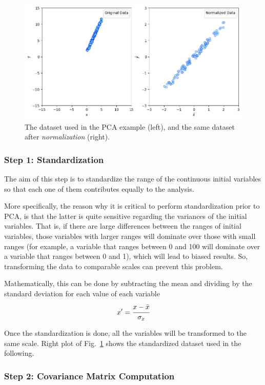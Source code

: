 \begin{figure}[htb]
	\centering
	\includegraphics[width=0.9\linewidth]{figures/pca_example_raw_normalized_data.png}
	\caption{The dataset used in the PCA example (left), and the same dataset after \emph{normalization} (right).}
	\label{fig:pca_dataset}
\end{figure}

\subsubsection*{Step 1: Standardization}

The aim of this step is to standardize the range of the continuous initial variables so that each one of them contributes equally to the analysis.

More specifically, the reason why it is critical to perform standardization prior to PCA, is that the latter is quite sensitive regarding the variances of the initial variables. That is, if there are large differences between the ranges of initial variables, those variables with larger ranges will dominate over those with small ranges (for example, a variable that ranges between 0 and 100 will dominate over a variable that ranges between 0 and 1), which will lead to biased results. So, transforming the data to comparable scales can prevent this problem.

Mathematically, this can be done by subtracting the mean and dividing by the standard deviation for each value of each variable
\begin{equation*}
x' = \cfrac{x-\bar{x}}{\sigma_x}
\end{equation*}

Once the standardization is done, all the variables will be transformed to the same scale. Right plot of Fig.~\ref{fig:pca_dataset} shows the standardized dataset used in the following.

\subsubsection*{Step 2: Covariance Matrix Computation}

